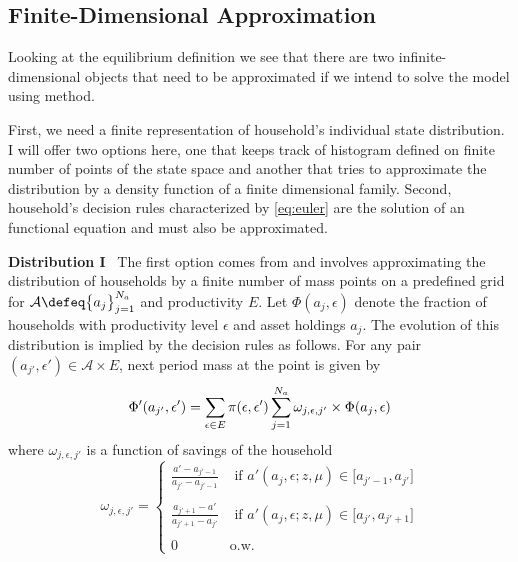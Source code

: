 \documentclass[a4paper,11pt]{article}  %
\begin{document}
\subsection{Finite-Dimensional Approximation} %
\label{sub:finite_dimensional_approximation}
Looking at the equilibrium definition we see that there are two infinite-dimensional objects that need
to be approximated if we intend to solve the model using \citet{reiter} method.

First, we need a finite representation of household's individual state distribution. I will offer two
options here, one that keeps track of histogram defined on finite number of points of the state space and
another that tries to approximate the distribution by a density function of a finite dimensional family.
Second, household's decision rules characterized by \eqref{eq:euler} are the solution of an functional equation and
must also be approximated.

\textbf{Distribution I} \
The first option comes from \citet{reiter} and involves approximating the distribution of households by a
finite number of mass points on a predefined grid for $ \mathcal{A} \defeq \big\{ a_j \big\}_{j=1}^{N_a} $ and productivity $E$.
Let $ \Phi( a_j, \epsilon ) $ denote the fraction of households with productivity level $ \epsilon $ and
asset holdings $ a_j $. The evolution of this distribution is implied by the decision rules as follows.
For any pair $ ( a_{j'}, \epsilon' ) \in \mathcal{A}\times E $, next period mass at the point is given by
\begin{equation}
   \Phi' ( a_{j'}, \epsilon' ) = \sum_{ \epsilon \in E } \pi( \epsilon, \epsilon' )
   \sum_{ j=1 }^{N_a}
   \omega_{j,\epsilon, j'}
   \times  \Phi(a_j, \epsilon) \\
\end{equation}
where $\omega_{j,\epsilon, j'}$ is a function of savings of the household
\begin{equation*}
   \label{eq:weight}
   \omega_{j,\epsilon, j'} = \begin{cases}
   \frac{ a' - a_{j'-1} }{ a_{j'} - a_{j'-1} } & \text{ if }
   a'( a_j, \epsilon ; z, \mu ) \in \Big[ a_{j'-1}, a_{j'} \Big] \\ \ & \ \\
   \frac{ a_{j'+1} - a' }{ a_{j'+1} - a_{j'} } & \text{ if }
   a'( a_j, \epsilon ; z , \mu) \in \Big[ a_{j'}, a_{j'+1} \Big] \\ \ & \ \\
   0 & \text{o.w.}
   \end{cases}
\end{equation*}
\end{document}
